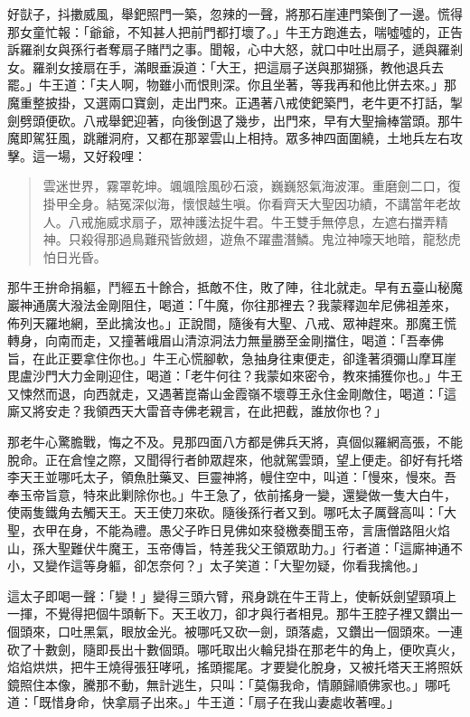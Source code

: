 好獃子，抖擻威風，舉鈀照門一築，忽辣的一聲，將那石崖連門築倒了一邊。慌得那女童忙報：「爺爺，不知甚人把前門都打壞了。」牛王方跑進去，喘噓噓的，正告訴羅剎女與孫行者奪扇子賭鬥之事。聞報，心中大怒，就口中吐出扇子，遞與羅剎女。羅剎女接扇在手，滿眼垂淚道：「大王，把這扇子送與那猢猻，教他退兵去罷。」牛王道：「夫人啊，物雖小而恨則深。你且坐著，等我再和他比併去來。」那魔重整披掛，又選兩口寶劍，走出門來。正遇著八戒使鈀築門，老牛更不打話，掣劍劈頭便砍。八戒舉鈀迎著，向後倒退了幾步，出門來，早有大聖掄棒當頭。那牛魔即駕狂風，跳離洞府，又都在那翠雲山上相持。眾多神四面圍繞，土地兵左右攻擊。這一場，又好殺哩：
\begin{quote}
雲迷世界，霧罩乾坤。颯颯陰風砂石滾，巍巍怒氣海波渾。重磨劍二口，復掛甲全身。結冤深似海，懷恨越生嗔。你看齊天大聖因功績，不講當年老故人。八戒施威求扇子，眾神護法捉牛君。牛王雙手無停息，左遮右擋弄精神。只殺得那過鳥難飛皆斂翅，遊魚不躍盡潛鱗。鬼泣神嚎天地暗，龍愁虎怕日光昏。
\end{quote}

那牛王拚命捐軀，鬥經五十餘合，抵敵不住，敗了陣，往北就走。早有五臺山秘魔巖神通廣大潑法金剛阻住，喝道：「牛魔，你往那裡去？我蒙釋迦牟尼佛祖差來，佈列天羅地網，至此擒汝也。」正說間，隨後有大聖、八戒、眾神趕來。那魔王慌轉身，向南而走，又撞著峨眉山清涼洞法力無量勝至金剛擋住，喝道：「吾奉佛旨，在此正要拿住你也。」牛王心慌腳軟，急抽身往東便走，卻逢著須彌山摩耳崖毘盧沙門大力金剛迎住，喝道：「老牛何往？我蒙如來密令，教來捕獲你也。」牛王又悚然而退，向西就走，又遇著崑崙山金霞嶺不壞尊王永住金剛敵住，喝道：「這廝又將安走？我領西天大雷音寺佛老親言，在此把截，誰放你也？」

那老牛心驚膽戰，悔之不及。見那四面八方都是佛兵天將，真個似羅網高張，不能脫命。正在倉惶之際，又聞得行者帥眾趕來，他就駕雲頭，望上便走。卻好有托塔李天王並哪吒太子，領魚肚藥叉、巨靈神將，幔住空中，叫道：「慢來，慢來。吾奉玉帝旨意，特來此剿除你也。」牛王急了，依前搖身一變，還變做一隻大白牛，使兩隻鐵角去觸天王。天王使刀來砍。隨後孫行者又到。哪吒太子厲聲高叫：「大聖，衣甲在身，不能為禮。愚父子昨日見佛如來發檄奏聞玉帝，言唐僧路阻火焰山，孫大聖難伏牛魔王，玉帝傳旨，特差我父王領眾助力。」行者道：「這廝神通不小，又變作這等身軀，卻怎奈何？」太子笑道：「大聖勿疑，你看我擒他。」

這太子即喝一聲：「變！」變得三頭六臂，飛身跳在牛王背上，使斬妖劍望頸項上一揮，不覺得把個牛頭斬下。天王收刀，卻才與行者相見。那牛王腔子裡又鑽出一個頭來，口吐黑氣，眼放金光。被哪吒又砍一劍，頭落處，又鑽出一個頭來。一連砍了十數劍，隨即長出十數個頭。哪吒取出火輪兒掛在那老牛的角上，便吹真火，焰焰烘烘，把牛王燒得張狂哮吼，搖頭擺尾。才要變化脫身，又被托塔天王將照妖鏡照住本像，騰那不動，無計逃生，只叫：「莫傷我命，情願歸順佛家也。」哪吒道：「既惜身命，快拿扇子出來。」牛王道：「扇子在我山妻處收著哩。」

